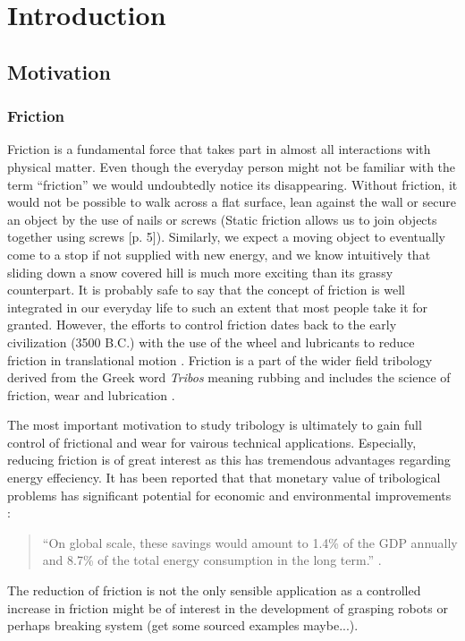 \chapter*{Introduction}

\section{Motivation}
\subsection{Friction}

Friction is a fundamental force that takes part in almost all interactions with
physical matter. Even though the everyday person might not be familiar with the
term ``friction'' we would undoubtedly notice its disappearing. Without
friction, it would not be possible to walk across a flat surface, lean against
the wall or secure an object by the use of nails or screws (Static friction allows us to join objects together using screws \cite{gnecco_meyer_2015}[p. 5]). Similarly, we expect
a moving object to eventually come to a stop if not supplied with new energy,
and we know intuitively that sliding down a snow covered hill is much more
exciting than its grassy counterpart. It is probably safe to say that the
concept of friction is well integrated in our everyday life to such an extent
that most people take it for granted. However, the efforts to control friction
dates back to the early civilization (3500 B.C.) with the use of the wheel and
lubricants to reduce friction in translational motion \cite{bhushan_2013}. Friction is a part of the wider field tribology derived from the Greek word \textit{Tribos} meaning rubbing and includes the science of friction, wear and lubrication \cite{bhushan_2013}.

The most important motivation to study tribology is ultimately to gain full control of frictional and wear for vairous technical applications. Especially, reducing friction is of great interest as this has tremendous advantages regarding
energy effeciency. It has been reported that that monetary value of tribological problems has significant potential for economic and environmental improvements \cite{kim_nano-scale_2009}:
\begin{quote}
    ``On global scale, these savings would amount to 1.4\% of the GDP annually and 8.7\% of the total energy consumption in the long term.'' \cite{holmberg_influence_2017}. 
\end{quote}
The reduction of friction is not the only sensible application as a controlled increase in friction might be of interest in the development of grasping robots or perhaps breaking system (get some sourced examples maybe...). 



